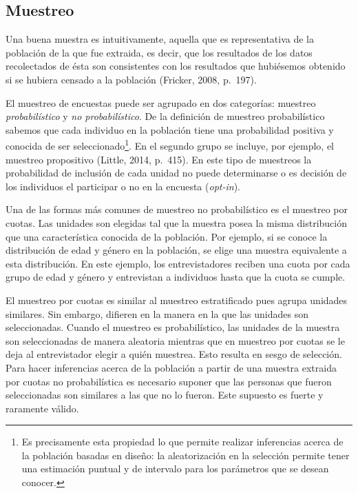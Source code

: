 \documentclass[]{article}
\let\rmarkdownfootnote\footnote%
\def\footnote{\protect\rmarkdownfootnote}
\begin{document}
\subsection{Muestreo}\label{muestreo}

Una buena muestra es intuitivamente, aquella que es representativa de la
población de la que fue extraida, es decir, que los resultados de los
datos recolectados de ésta son consistentes con los resultados que
hubiésemos obtenido si se hubiera censado a la población (Fricker, 2008,
p.~197).

El muestreo de encuestas puede ser agrupado en dos categorías: muestreo
\emph{probabilístico} y \emph{no probabilístico}. De la definición de
muestreo probabilístico sabemos que cada individuo en la población tiene
una probabilidad positiva y conocida de ser seleccionado\footnote{Es
  precisamente esta propiedad lo que permite realizar inferencias acerca
  de la población basadas en diseño: la aleatorización en la selección
  permite tener una estimación puntual y de intervalo para los
  parámetros que se desean conocer.}. En el segundo grupo se incluye,
por ejemplo, el muestreo propositivo (Little, 2014, p.~415). En este
tipo de muestreos la probabilidad de inclusión de cada unidad no puede
determinarse o es decisión de los individuos el participar o no en la
encuesta (\emph{opt-in}).

Una de las formas más comunes de muestreo no probabilístico es el
muestreo por cuotas. Las unidades son elegidas tal que la muestra posea
la misma distribución que una característica conocida de la población.
Por ejemplo, si se conoce la distribución de edad y género en la
población, se elige una muestra equivalente a esta distribución. En este
ejemplo, los entrevistadores reciben una cuota por cada grupo de edad y
género y entrevistan a individuos hasta que la cuota se cumple.

El muestreo por cuotas es similar al muestreo estratificado pues agrupa
unidades similares. Sin embargo, difieren en la manera en la que las
unidades son seleccionadas. Cuando el muestreo es probabilístico, las
unidades de la muestra son seleccionadas de manera aleatoria mientras
que en muestreo por cuotas se le deja al entrevistador elegir a quién
muestrea. Esto resulta en sesgo de selección. Para hacer inferencias
acerca de la población a partir de una muestra extraida por cuotas no
probabilística es necesario suponer que las personas que fueron
seleccionadas son similares a las que no lo fueron. Este supuesto es
fuerte y raramente válido.
\end{document}
